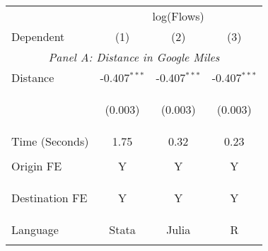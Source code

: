 \begin{tabular}{lccc}
\hline \noalign{\smallskip} & \multicolumn{3}{c}{log(Flows)}\\
Dependent & (1) & (2) & (3) \\
\hline \multicolumn{4}{c}{\textit{Panel A: Distance in Google Miles}}\\
\noalign{\smallskip}\noalign{\smallskip}Distance & -0.407$ ^{***}$ & -0.407$ ^{***}$ & -0.407$ ^{***}$ \\
 & \begin{footnotesize}(0.003)\end{footnotesize} & \begin{footnotesize}(0.003)\end{footnotesize} & \begin{footnotesize}(0.003)\end{footnotesize}\\

\noalign{\smallskip}Time (Seconds) & 1.75 & 0.32 & 0.23 \\
 & \begin{footnotesize}\end{footnotesize} & \begin{footnotesize}\end{footnotesize} & \begin{footnotesize}\end{footnotesize} \\
\noalign{\smallskip}\hline Origin FE & Y & Y & Y \\
Destination FE & \begin{footnotesize}Y\end{footnotesize} & \begin{footnotesize}Y\end{footnotesize} & \begin{footnotesize}Y\end{footnotesize} \\
Language & Stata & Julia & R\\
\noalign{\smallskip}\hline\end{tabular}\\
